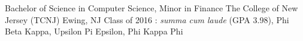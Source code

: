 

\begin{cventries}

  \cventry
    {Bachelor of Science in Computer Science, Minor in Finance} %
    {The College of New Jersey (TCNJ)} %
    {Ewing, NJ} %
    {Class of 2016} %
    {: \emph{summa cum laude} (GPA 3.98), Phi Beta Kappa, Upsilon Pi Epsilon, Phi Kappa Phi}

\end{cventries}
